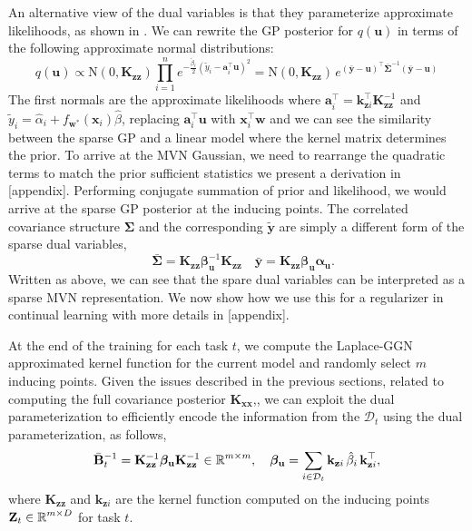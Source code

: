 \documentclass{article}
\newcommand{\dataset}{\ensuremath{\mathcal{D}}}
\newcommand{\mathbold}[1]{\bm{#1}}
\newcommand{\mbf}[1]{\mathbf{#1}}
\newcommand{\MB}{\mbf{B}}
\newcommand{\MZ}{\mbf{Z}}
\newcommand{\MX}{\mbf{X}}
\newcommand{\T}{\top}
\newcommand{\valpha}[0]{\mathbold{\alpha}}
\newcommand{\vbeta}[0]{\mathbold{\beta}}
\newcommand{\vu}{\mbf{u}}
\newcommand{\vx}{\mbf{x}}
\newcommand{\vy}{\mbf{y}}
\newcommand{\vw}{\mbf{w}}
\newcommand{\va}{\mbf{a}}
\newcommand{\MKzz}{\mbf{K}_{\mbf{z}\mbf{z}}}
\newcommand{\MKxx}{\mbf{K}_{\mbf{x}\mbf{x}}}
\newcommand{\vkzi}{\mbf{k}_{\mbf{z}i}}
\newcommand{\MSigma}[0]{\mathbold{\Sigma}}
\newcommand{\N}{\mathrm{N}}
\begin{document}
An alternative view of the dual variables is that they parameterize approximate likelihoods, as shown in \citep{adam2021dual, khan2017conjugate}. We can rewrite the GP posterior for $q(\vu)$ in terms of the following approximate normal distributions:
\begin{equation}
 q(\vu) \propto \N(0, \MKzz) \prod_{i=1}^n e^{-\frac{\tilde{\beta}_i}{2}(\tilde{y}_i - \va_i^\top \vu)^2 } = \N(0, \MKzz) \, e^{(\bar{\vy} - \vu)^\top \bar{\MSigma}^{-1}(\bar{\vy} - \vu)}  
\end{equation}
The first normals are the approximate likelihoods where $\va_i^\top = \vkzi^\top \MKzz^{-1}$ and $\tilde{y}_i = \hat{\alpha}_i + f_{\vw^*}(\vx_i)\hat{\beta}$,  replacing $\va_i^\top \vu$ with $\vx_i^{\top}\vw$ and we can see the similarity between the sparse GP and a linear model where the kernel matrix determines the prior. To arrive at the MVN Gaussian, we need to rearrange the quadratic terms to match the prior sufficient statistics we present a derivation in [appendix]. Performing conjugate summation of prior and likelihood, we would arrive at the sparse GP posterior at the inducing points. The correlated covariance structure $\MSigma$ and the corresponding $\tilde{\vy}$ are simply a different form of the sparse dual variables,
\begin{equation}
\quad \bar{\MSigma} =  \MKzz \vbeta_\vu^{-1} \MKzz \quad \bar{\vy} = \MKzz \vbeta_{\vu}\valpha_{\vu}.
\end{equation}
Written as above, we can see that the spare dual variables can be interpreted as a sparse MVN representation. We now show how we use this for a regularizer in continual learning with more details in [appendix].

At the end of the training for each task $t$, we compute the Laplace-GGN approximated kernel function for the current model and randomly select $m$ inducing points. Given the issues described in the previous sections, related to computing the full covariance posterior $\MKxx$,\todo{this should be $\kappa(\MX_t, \MX_t)$}, we can exploit the dual parameterization to efficiently encode the information from the $\dataset_t$ using the dual parameterization, as follows, 
\begin{equation}
 	\bar{\MB}^{-1}_t = \MKzz^{-1} \vbeta_\vu \MKzz^{-1} \in \R^{m \times m}, 
 	\quad 
 	\vbeta_{\vu} =  \sum_{i \in \dataset_t} \vkzi \,\hat{\beta}_{i} \, \vkzi^{\T} ,    
 \end{equation}
 where $\MKzz$ and $\vkzi$ are the kernel function computed on the inducing points $\MZ_t \in \R^{m \times D}$ for task $t$.
 
\end{document}
